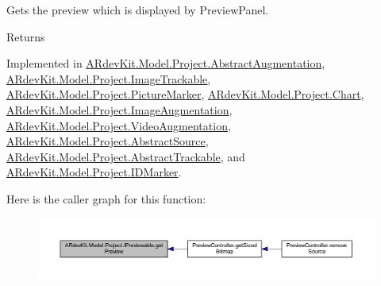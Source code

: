 Gets the preview which is displayed by Preview\-Panel. 

\begin{DoxyReturn}{Returns}

\end{DoxyReturn}


Implemented in \hyperlink{class_a_rdev_kit_1_1_model_1_1_project_1_1_abstract_augmentation_a627330061b5df53ece5646e1cf83ff0f}{A\-Rdev\-Kit.\-Model.\-Project.\-Abstract\-Augmentation}, \hyperlink{class_a_rdev_kit_1_1_model_1_1_project_1_1_image_trackable_a96e42ce5c75d50a49b617d8eb8f87b99}{A\-Rdev\-Kit.\-Model.\-Project.\-Image\-Trackable}, \hyperlink{class_a_rdev_kit_1_1_model_1_1_project_1_1_picture_marker_a9d608a1d9abb84c8109b7f34efffc658}{A\-Rdev\-Kit.\-Model.\-Project.\-Picture\-Marker}, \hyperlink{class_a_rdev_kit_1_1_model_1_1_project_1_1_chart_aab1b49aedaba3798818abd14c69918e8}{A\-Rdev\-Kit.\-Model.\-Project.\-Chart}, \hyperlink{class_a_rdev_kit_1_1_model_1_1_project_1_1_image_augmentation_a76230c0eb40c317bab23b37c27ea3a39}{A\-Rdev\-Kit.\-Model.\-Project.\-Image\-Augmentation}, \hyperlink{class_a_rdev_kit_1_1_model_1_1_project_1_1_video_augmentation_a3d5968ace1fe7b6becfc10b60f573631}{A\-Rdev\-Kit.\-Model.\-Project.\-Video\-Augmentation}, \hyperlink{class_a_rdev_kit_1_1_model_1_1_project_1_1_abstract_source_abd9f742efb27a1fca992f6627c0421e4}{A\-Rdev\-Kit.\-Model.\-Project.\-Abstract\-Source}, \hyperlink{class_a_rdev_kit_1_1_model_1_1_project_1_1_abstract_trackable_ab4d8a1902c82fe7a1d385d5688f92bd8}{A\-Rdev\-Kit.\-Model.\-Project.\-Abstract\-Trackable}, and \hyperlink{class_a_rdev_kit_1_1_model_1_1_project_1_1_i_d_marker_a4533a46611ee75747a5cf96f3fc2586c}{A\-Rdev\-Kit.\-Model.\-Project.\-I\-D\-Marker}.



Here is the caller graph for this function\-:
\nopagebreak
\begin{figure}[H]
\begin{center}
\leavevmode
\includegraphics[width=350pt]{interface_a_rdev_kit_1_1_model_1_1_project_1_1_i_previewable_a7cbcbb20929f4f1b6db3321ed2e83070_icgraph}
\end{center}
\end{figure}


